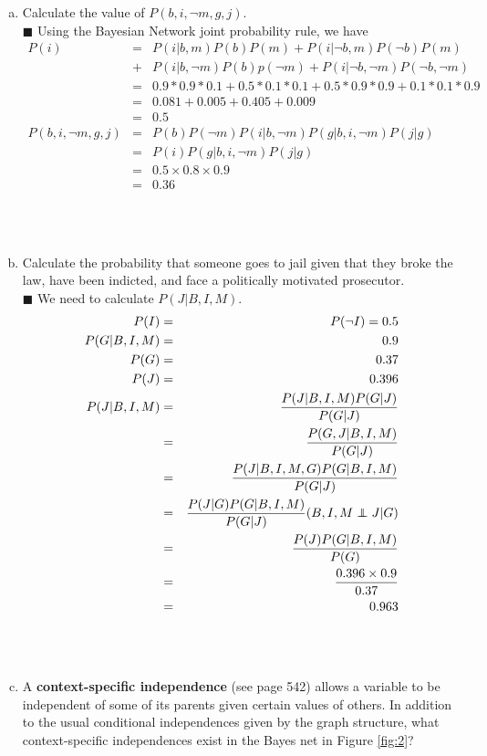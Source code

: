 \documentclass{article}
\newcommand{\solution}[1]{~\\ $\blacksquare$ \sffamily\upshape\selectfont #1
\normalfont ~\\~ }
\newcommand\independent{\protect\mathpalette{\protect\independenT}{\perp}}
\def\independenT#1#2{\mathrel{\rlap{$#1#2$}\mkern2mu{#1#2}}}
\begin{document}
\begin{enumerate}[a.]
\item Calculate the value of $P(b, i, \neg m, g, j)$.
\solution{Using the Bayesian Network joint probability rule, we have 
\begin{eqnarray*}
  P(i) & = & P(i|b,m)P(b)P(m) + P(i|\neg b,m)P(\neg b)P(m) \\
  & + & P(i|b,\neg m)P(b)p(\neg m) + P(i|\neg b,\neg m)P(\neg b,\neg
  m) \\
  & = & 0.9*0.9*0.1 + 0.5*0.1*0.1 + 0.5*0.9*0.9 + 0.1*0.1*0.9 \\
  & = & 0.081 + 0.005 + 0.405 + 0.009 \\
  & = & 0.5 \\
  P(b, i, \neg m, g, j) & = & P(b)P(\neg m)P(i|b,\neg m)P(g|b,i,\neg
  m)P(j|g) \\
  & = & P(i)P(g|b,i,\neg m)P(j|g) \\
  & = & 0.5 \times 0.8 \times 0.9 \\
  & = & 0.36 
\end{eqnarray*}
}
\item Calculate the probability that someone goes to jail given that
  they broke the law, have been indicted, and face a politically
  motivated prosecutor.
\solution{We need to calculate $P(J|B,I,M)$. \\
  \begin{eqnarray*}
    P(I) & = & P(\neg I) = 0.5 \\
    P(G|B,I,M) & = & 0.9 \\ 
    P(G) & = & 0.37 \\
    P(J) & = & 0.396 \\
    P(J|B,I,M) & = & \frac{P(J|B,I,M)P(G|J)}{P(G|J)} \\
    & = & \frac{P(G,J|B,I,M)}{P(G|J)} \\ 
    & = & \frac{P(J|B,I,M,G)P(G|B,I,M)}{P(G|J)} \\
    & = & \frac{P(J|G)P(G|B,I,M)}{P(G|J)} (B,I,M\independent{J|G}) \\
    & = & \frac{P(J)P(G|B,I,M)}{P(G)} \\
    & = & \frac{0.396\times 0.9}{0.37} \\
    & = & 0.963 
  \end{eqnarray*}
}
\item A \textbf{context-specific independence} (see page 542) allows a
  variable to be independent of some of its parents given certain
  values of others. In addition to the usual conditional independences
  given by the graph structure, what context-specific independences
  exist in the Bayes net in Figure \ref{fig:2}?

\end{enumerate}
\end{document}
